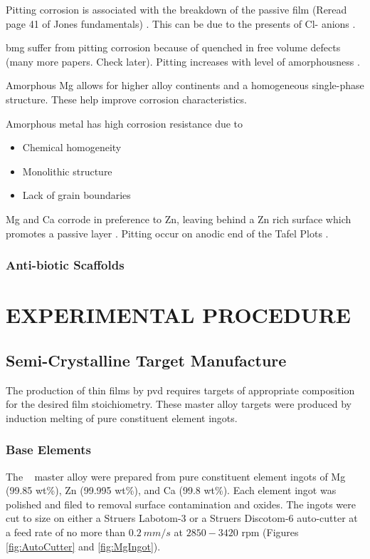 \documentclass[a4paper,12pt,oneside]{report}%
\begin{document}
Pitting corrosion is associated with the breakdown of the passive film (Reread page 41 of Jones fundamentals) \cite{Zheng2014, Jones1992, Schweitzer2009}. This can be due to the presents of Cl- anions \cite{Zheng2014}. 

 \Gls{bmg} suffer from pitting corrosion because of quenched in free volume defects \cite{Wang2012} (many more papers. Check later). Pitting increases with level of amorphousness \cite{Schluter2012}. 

Amorphous Mg allows for higher alloy continents and a homogeneous single-phase structure. These help improve corrosion characteristics. 

Amorphous metal has high corrosion resistance due to

\begin{itemize}
	\item Chemical homogeneity 
	\item Monolithic structure
	\item Lack of grain boundaries 
\end{itemize}
 
Mg and Ca corrode in preference to Zn, leaving behind a Zn rich surface which promotes a passive layer \cite{Wang2012}.
Pitting occur on anodic end of the Tafel Plots \cite{Schluter2012}.

\subsection{Anti-biotic Scaffolds}



\chapter{EXPERIMENTAL PROCEDURE}
\glsresetall

\section{Semi-Crystalline Target Manufacture} \label{sec:TargetManufacture}
The production of thin films by \gls{pvd} requires targets of appropriate composition for the desired film stoichiometry. These master alloy targets were produced by induction melting of pure constituent element ingots.

\subsection{Base Elements}
The \MgZnCa~ master alloy were prepared from pure constituent element ingots of Mg (99.85 wt\%), Zn (99.995 wt\%), and Ca (99.8 wt\%). Each element ingot was polished and filed to removal surface contamination and oxides. The ingots were cut to size on either a Struers Labotom-3 or a Struers Discotom-6 auto-cutter at a feed rate of no more than $0.2~ mm/s$ at $2850 - 3420$ \acrshort{rpm} (Figures \ref{fig:AutoCutter} and \ref{fig:MgIngot}).
\end{document}
